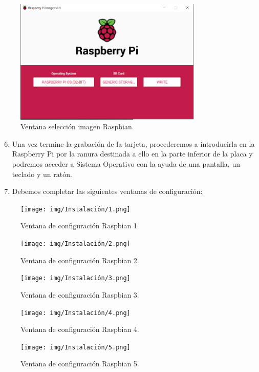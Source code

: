 \begin{figure}[h]
\centering
\includegraphics[width=0.8\textwidth]{img/fotos/flasheadoSDRbP.PNG}
\caption{Ventana selección imagen Raspbian.}\label{flasheadoSDRbP}
\end{figure}

\begin{enumerate}
\setcounter{enumi}{5}
    \item Una vez termine la grabación de la tarjeta, procederemos a introducirla en la Raspberry Pi por la ranura destinada a ello en la parte inferior de la placa y podremos acceder a Sistema Operativo con la ayuda de una pantalla, un teclado y un ratón.
    \item Debemos completar las siguientes ventanas de configuración:
\end{enumerate}
\begin{figure}[h]
\centering
\texttt{[image: img/Instalación/1.png]}
\caption{Ventana de configuración Raspbian 1.}\label{Instala1}
\end{figure}

\begin{figure}[h]
\centering
\texttt{[image: img/Instalación/2.png]}
\caption{Ventana de configuración Raspbian 2.}\label{Instala2}
\end{figure}

\begin{figure}[h]
\centering
\texttt{[image: img/Instalación/3.png]}
\caption{Ventana de configuración Raspbian 3.}\label{Instala3}
\end{figure}

\begin{figure}[h]
\centering
\texttt{[image: img/Instalación/4.png]}
\caption{Ventana de configuración Raspbian 4.}\label{Instala4}
\end{figure}

\begin{figure}[h]
\centering
\texttt{[image: img/Instalación/5.png]}
\caption{Ventana de configuración Raspbian 5.}\label{Instala5}
\end{figure}

